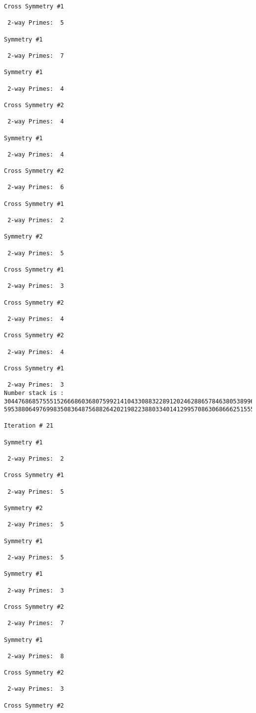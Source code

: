 \begin{verbatim}
Cross Symmetry #1

 2-way Primes: 	5

Symmetry #1

 2-way Primes: 	7

Symmetry #1

 2-way Primes: 	4

Cross Symmetry #2

 2-way Primes: 	4

Symmetry #1

 2-way Primes: 	4

Cross Symmetry #2

 2-way Primes: 	6

Cross Symmetry #1

 2-way Primes: 	2

Symmetry #2

 2-way Primes: 	5

Cross Symmetry #1

 2-way Primes: 	3

Cross Symmetry #2

 2-way Primes: 	4

Cross Symmetry #2

 2-way Primes: 	4

Cross Symmetry #1

 2-way Primes: 	3
Number stack is :
30447686857555152666860368075992141043308832289120246288657846380538996794608835958544046240163340857
59538806497699835083648756882642021982238803340141299570863068666251555758686744037580433610426404458

Iteration #	21

Symmetry #1

 2-way Primes: 	2

Cross Symmetry #1

 2-way Primes: 	5

Symmetry #2

 2-way Primes: 	5

Symmetry #1

 2-way Primes: 	5

Symmetry #1

 2-way Primes: 	3

Cross Symmetry #2

 2-way Primes: 	7

Symmetry #1

 2-way Primes: 	8

Cross Symmetry #2

 2-way Primes: 	3

Cross Symmetry #2


\end{verbatim}

